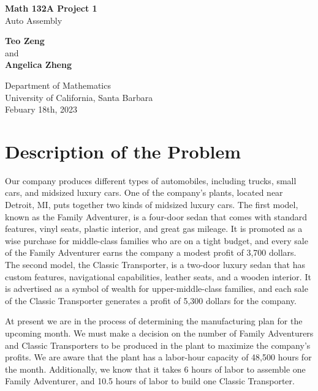 \documentclass[
]{article}
\author{}
\date{}
\begin{document}
\begin{titlepage}
  \begin{center}
      \vspace*{1cm}
      \Huge
      \textbf{Math 132A Project 1} \\
      \LARGE
       Auto Assembly
           
      \vspace{1.5cm}
      \large
      \textbf{Teo Zeng}\\
      and\\
      \textbf{Angelica Zheng}
      \vfill
           
           
      \vspace{0.8cm}
  
      \Large
      Department of Mathematics\\
      University of California, Santa Barbara\\
      Febuary 18th, 2023\\
           
  \end{center}
\end{titlepage}

\hypertarget{description-of-the-problem}{%
\section{Description of the
Problem}\label{description-of-the-problem}}

Our company produces different types of automobiles, including trucks,
small cars, and midsized luxury cars. One of the company's plants,
located near Detroit, MI, puts together two kinds of midsized luxury
cars. The first model, known as the Family Adventurer, is a four-door
sedan that comes with standard features, vinyl seats, plastic interior,
and great gas mileage. It is promoted as a wise purchase for
middle-class families who are on a tight budget, and every sale of the
Family Adventurer earns the company a modest profit of 3,700 dollars.
The second model, the Classic Transporter, is a two-door luxury sedan
that has custom features, navigational capabilities, leather seats, and
a wooden interior. It is advertised as a symbol of wealth for
upper-middle-class families, and each sale of the Classic Transporter
generates a profit of 5,300 dollars for the company.

At present we are in the process of determining the manufacturing plan
for the upcoming month. We must make a decision on the number of Family
Adventurers and Classic Transporters to be produced in the plant to
maximize the company's profits. We are aware that the plant has a
labor-hour capacity of 48,500 hours for the month. Additionally, we know
that it takes 6 hours of labor to assemble one Family Adventurer, and
10.5 hours of labor to build one Classic Transporter.
\end{document}
